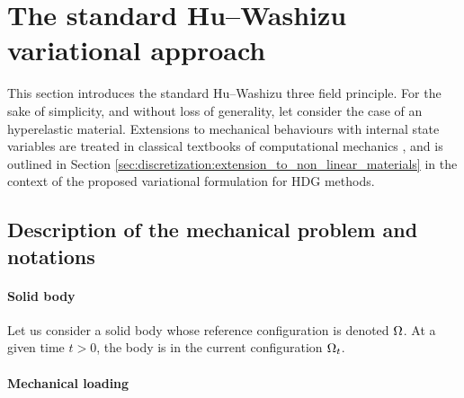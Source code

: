 \section{The standard Hu–Washizu variational approach}
\label{sec_model_problem}

This section introduces the standard Hu–Washizu three field
principle. For the sake of simplicity, and without loss of generality,
let consider the case of an hyperelastic material. Extensions to
mechanical behaviours with internal state variables are treated in
classical textbooks of computational mechanics
\cite{belytschko_nonlinear_nodate,besson_non-linear_2010}, and is outlined in Section \ref{sec:discretization:extension_to_non_linear_materials}
in the context of the proposed variational formulation for HDG methods.

\subsection{Description of the mechanical problem and notations}

\paragraph{Solid body}

Let us consider a solid body whose reference configuration is denoted
$\Omega$. At a given time $t > 0$, the body is in the current
configuration $\Omega_t$.

\paragraph{Mechanical loading}

